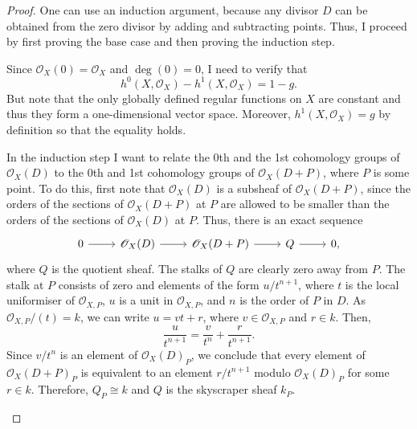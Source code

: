 \begin{proof}
  One can use an induction argument, because any divisor $D$ can be
  obtained from the zero divisor by adding and subtracting points.
  Thus, I proceed by first proving the base case and then proving
  the induction step.

  \begin{description}[style=nextline]
    \item[base case$\big)$]
          Since $\mathscr{O}_X(0)=\mathscr{O}_{X}$ and $\deg(0)=0$,
          I need to verify that
          \[h^{0}(X, \mathscr{O}_{X})-h^{1}(X, \mathscr{O}_{X})=1-g.\]
          But note that the only globally defined regular functions
          on $X$ are constant and thus they form a one-dimensional vector
          space. Moreover, $h^{1}(X, \mathscr{O}_{X})=g$ by definition
          so that the equality holds.
    \item[induction step$\big)$]
          In the induction step I want to relate the 0th and the 1st
          cohomology groups of $\mathscr{O}_X(D)$ to the 0th and
          1st cohomology groups of $\mathscr{O}_X(D+P)$, where
          $P$ is some point. To do this, first note that
          $\mathscr{O}_X(D)$ is a subsheaf of $\mathscr{O}_X(D+P)$, since
          the orders of the sections of $\mathscr{O}_X(D+P)$ at $P$ are
          allowed to be smaller than the orders of the sections of
          $\mathscr{O}_X(D)$ at $P$. Thus, there is an exact sequence
          \[
          \begin{tikzcd}
            0\arrow{r} & \mathscr{O}_X(D)\arrow{r} & \mathscr{O}_X(D+P)\arrow{r}
            & Q\arrow{r} & 0,
          \end{tikzcd}
          \]
          where $Q$ is the quotient sheaf. The stalks of $Q$ are clearly
          zero away from $P$. The stalk at $P$ consists of zero and
          elements of the form $u/t^{n+1}$, where $t$ is the local
          uniformiser of $\mathscr{O}_{X,P}$, $u$ is a unit in
          $\mathcal{O}_{X,P}$, and $n$ is the order of $P$ in $D$.
          As $\mathcal{O}_{X,P}/(t)=k$, we can write $u=vt+r$,
          where $v\in\mathcal{O}_{X,P}$ and $r\in k$.
          Then,
          \[\frac{u}{t^{n+1}}=\frac{v}{t^n}+\frac{r}{t^{n+1}}.\]
          Since $v/t^n$ is an element of $\mathscr{O}_X(D)_{P}$, we conclude
          that every element of $\mathscr{O}_X(D+P)_{P}$ is equivalent to
          an element $r/t^{n+1}$ modulo $\mathscr{O}_X(D)_{P}$ for some
          $r\in k$. Therefore, $Q_{P}\cong k$ and $Q$ is the skyscraper sheaf
          $k_{P}$.


\end{description}
\end{proof}
